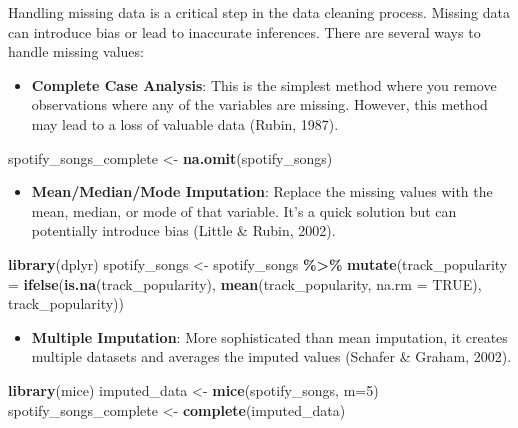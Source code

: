 \documentclass[
]{book}
\newenvironment{Shaded}{\begin{snugshade}}{\end{snugshade}}
\newcommand{\AttributeTok}[1]{\textcolor[rgb]{0.13,0.29,0.53}{#1}}
\newcommand{\ConstantTok}[1]{\textcolor[rgb]{0.56,0.35,0.01}{#1}}
\newcommand{\DecValTok}[1]{\textcolor[rgb]{0.00,0.00,0.81}{#1}}
\newcommand{\FunctionTok}[1]{\textcolor[rgb]{0.13,0.29,0.53}{\textbf{#1}}}
\newcommand{\NormalTok}[1]{#1}
\newcommand{\OtherTok}[1]{\textcolor[rgb]{0.56,0.35,0.01}{#1}}
\newcommand{\SpecialCharTok}[1]{\textcolor[rgb]{0.81,0.36,0.00}{\textbf{#1}}}
\providecommand{\tightlist}{%
  \setlength{\itemsep}{0pt}\setlength{\parskip}{0pt}}
\begin{document}
Handling missing data is a critical step in the data cleaning process. Missing data can introduce bias or lead to inaccurate inferences. There are several ways to handle missing values:

\begin{itemize}
\tightlist
\item
  \textbf{Complete Case Analysis}: This is the simplest method where you remove observations where any of the variables are missing. However, this method may lead to a loss of valuable data (Rubin, 1987).
\end{itemize}

\begin{Shaded}
\begin{Highlighting}[]
\NormalTok{spotify\_songs\_complete }\OtherTok{\textless{}{-}} \FunctionTok{na.omit}\NormalTok{(spotify\_songs)}
\end{Highlighting}
\end{Shaded}

\begin{itemize}
\tightlist
\item
  \textbf{Mean/Median/Mode Imputation}: Replace the missing values with the mean, median, or mode of that variable. It's a quick solution but can potentially introduce bias (Little \& Rubin, 2002).
\end{itemize}

\begin{Shaded}
\begin{Highlighting}[]
\FunctionTok{library}\NormalTok{(dplyr)}
\NormalTok{spotify\_songs }\OtherTok{\textless{}{-}}\NormalTok{ spotify\_songs }\SpecialCharTok{\%\textgreater{}\%}
  \FunctionTok{mutate}\NormalTok{(}\AttributeTok{track\_popularity =} \FunctionTok{ifelse}\NormalTok{(}\FunctionTok{is.na}\NormalTok{(track\_popularity), }\FunctionTok{mean}\NormalTok{(track\_popularity, }\AttributeTok{na.rm =} \ConstantTok{TRUE}\NormalTok{), track\_popularity))}
\end{Highlighting}
\end{Shaded}

\begin{itemize}
\tightlist
\item
  \textbf{Multiple Imputation}: More sophisticated than mean imputation, it creates multiple datasets and averages the imputed values (Schafer \& Graham, 2002).
\end{itemize}

\begin{Shaded}
\begin{Highlighting}[]
\FunctionTok{library}\NormalTok{(mice)}
\NormalTok{imputed\_data }\OtherTok{\textless{}{-}} \FunctionTok{mice}\NormalTok{(spotify\_songs, }\AttributeTok{m=}\DecValTok{5}\NormalTok{)}
\NormalTok{spotify\_songs\_complete }\OtherTok{\textless{}{-}} \FunctionTok{complete}\NormalTok{(imputed\_data)}
\end{Highlighting}
\end{Shaded}
\end{document}
